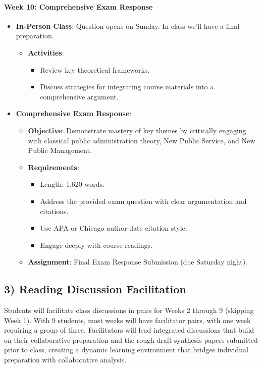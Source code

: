 \documentclass[12pt]{article}     %
\begin{document}
\paragraph{Week 10: Comprehensive Exam Response}
\begin{itemize}
    \item \textbf{In-Person Class}: Question opens on Sunday. In class we'll have a final preparation.
    \begin{itemize}
        \item \textbf{Activities}:
        \begin{itemize}
            \item Review key theoretical frameworks.
            \item Discuss strategies for integrating course materials into a comprehensive argument.
        \end{itemize}
    \end{itemize}
    \item \textbf{Comprehensive Exam Response}:
    \begin{itemize}
        \item \textbf{Objective}: Demonstrate mastery of key themes by critically engaging with classical public administration theory, New Public Service, and New Public Management.
        \item \textbf{Requirements}:
        \begin{itemize}
            \item Length: 1,620 words.
            \item Address the provided exam question with clear argumentation and citations.
            \item Use APA or Chicago author-date citation style.
            \item Engage deeply with course readings.
        \end{itemize}
        \item \textbf{Assignment}: Final Exam Response Submission (due Saturday night).
    \end{itemize}
\end{itemize}

\subsection*{3) Reading Discussion Facilitation}

Students will facilitate class discussions in pairs for Weeks 2 through 9 (skipping Week 1). With 9 students, most weeks will have facilitator pairs, with one week requiring a group of three. Facilitators will lead integrated discussions that build on their collaborative preparation and the rough draft synthesis papers submitted prior to class, creating a dynamic learning environment that bridges individual preparation with collaborative analysis.
\end{document}

